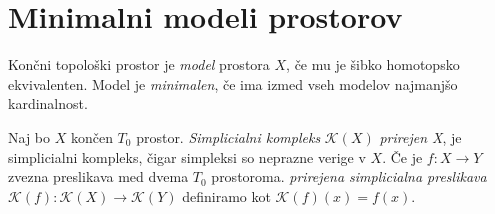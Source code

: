 \documentclass[mat1]{fmfdelo}
\begin{document}

   

\section{Minimalni modeli prostorov}\label{sec:minimal}

\begin{definicija}
    Končni topološki prostor je \textit{model} prostora $X$, če mu je šibko homotopsko ekvivalenten. Model je \textit{minimalen}, če ima izmed vseh modelov najmanjšo kardinalnost.
\end{definicija}


\begin{definicija}
    Naj bo $X$ končen $T_0$ prostor. \textit{Simplicialni kompleks} $\mathcal{K}(X)$ \textit{prirejen X}, je simplicialni kompleks, čigar simpleksi so neprazne verige v $X$. Če je $f: X\rightarrow Y$ zvezna preslikava med dvema $T_0$ prostoroma. \textit{prirejena simplicialna preslikava} $\mathcal{K}(f):\mathcal{K}(X) \rightarrow \mathcal{K}(Y)$ definiramo kot $\mathcal{K}(f)(x) = f(x)$.
\end{definicija}
\end{document}
